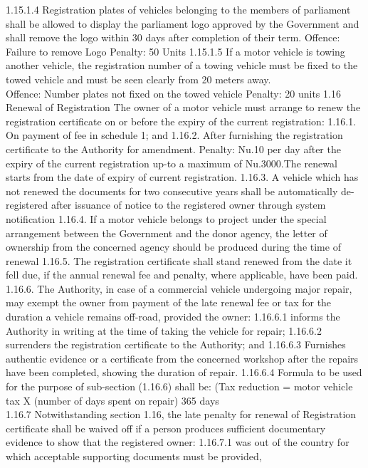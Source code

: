 \documentclass[
]{book}
\begin{document}
1.15.1.4 Registration plates of vehicles belonging to the members of parliament shall be allowed to display the parliament logo approved by the Government and shall remove the logo within 30 days after completion of their term.
Offence: Failure to remove Logo
Penalty: 50 Units
1.15.1.5 If a motor vehicle is towing another vehicle, the registration number of a towing vehicle must be fixed to the towed vehicle and must be seen clearly from 20 meters away.\\
Offence: Number plates not fixed on the towed vehicle
Penalty: 20 units
1.16 Renewal of Registration
The owner of a motor vehicle must arrange to renew the registration certificate on or before the expiry of the current registration:
1.16.1. On payment of fee in schedule 1; and
1.16.2. After furnishing the registration certificate to the Authority for amendment.
Penalty: Nu.10 per day after the expiry of the current registration up-to a maximum of Nu.3000.The renewal starts from the date of expiry of current registration.
1.16.3. A vehicle which has not renewed the documents for two consecutive years shall be automatically de-registered after issuance of notice to the registered owner through system notification
1.16.4. If a motor vehicle belongs to project under the special arrangement between the Government and the donor agency, the letter of ownership from the concerned agency should be produced during the time of renewal
1.16.5. The registration certificate shall stand renewed from the date it fell due, if the annual renewal fee and penalty, where applicable, have been paid.
1.16.6. The Authority, in case of a commercial vehicle undergoing major repair, may exempt the owner from payment of the late renewal fee or tax for the duration a vehicle remains off-road, provided the owner:
1.16.6.1 informs the Authority in writing at the time of taking the vehicle for repair;
1.16.6.2 surrenders the registration certificate to the Authority; and
1.16.6.3 Furnishes authentic evidence or a certificate from the concerned workshop after the repairs have been completed, showing the duration of repair.
1.16.6.4 Formula to be used for the purpose of sub-section (1.16.6) shall be:
(Tax reduction = motor vehicle tax X (number of days spent on repair)
365 days\\
1.16.7 Notwithstanding section 1.16, the late penalty for renewal of Registration certificate shall be waived off if a person produces sufficient documentary evidence to show that the registered owner:
1.16.7.1 was out of the country for which acceptable supporting documents must be provided,
\end{document}
